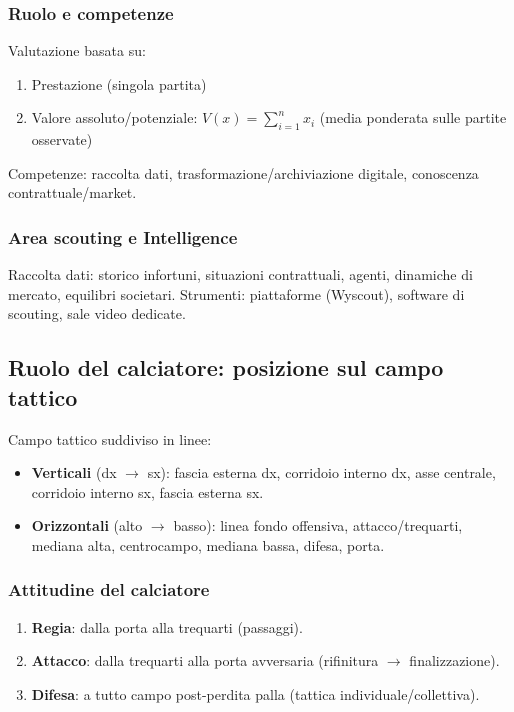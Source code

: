 \documentclass[a4paper,11pt]{article}
\begin{document}
\subsubsection{Ruolo e competenze}
Valutazione basata su:
\begin{enumerate}
    \item Prestazione (singola partita)
    \item Valore assoluto/potenziale: $V(x) = \sum_{i=1}^{n} x_i$ (media ponderata sulle partite osservate)
\end{enumerate}
Competenze: raccolta dati, trasformazione/archiviazione digitale, conoscenza contrattuale/market.

\subsubsection{Area scouting e Intelligence}
Raccolta dati: storico infortuni, situazioni contrattuali, agenti, dinamiche di mercato, equilibri societari. Strumenti: piattaforme (Wyscout), software di scouting, sale video dedicate.

\subsection{Ruolo del calciatore: posizione sul campo tattico}
Campo tattico suddiviso in linee:
\begin{itemize}
    \item \textbf{Verticali} (dx $\to$ sx): fascia esterna dx, corridoio interno dx, asse centrale, corridoio interno sx, fascia esterna sx.
    \item \textbf{Orizzontali} (alto $\to$ basso): linea fondo offensiva, attacco/trequarti, mediana alta, centrocampo, mediana bassa, difesa, porta.
\end{itemize}

\subsubsection{Attitudine del calciatore}
\begin{enumerate}
    \item \textbf{Regia}: dalla porta alla trequarti (passaggi).
    \item \textbf{Attacco}: dalla trequarti alla porta avversaria (rifinitura $\to$ finalizzazione).
    \item \textbf{Difesa}: a tutto campo post-perdita palla (tattica individuale/collettiva).
\end{enumerate}
\end{document}

